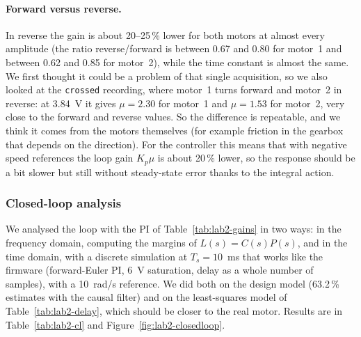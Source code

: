 \documentclass[english]{article}
\begin{document}
\paragraph{Forward versus reverse.} In reverse the gain is about 20--25\,\% lower for both motors at almost every
amplitude (the ratio reverse/forward is between 0.67 and 0.80 for motor~1 and between 0.62 and 0.85 for motor~2),
while the time constant is almost the same. We first thought it could be a problem of that single acquisition, so we
also looked at the \texttt{crossed} recording, where motor~1 turns forward and motor~2 in reverse: at 3.84~V it gives
$\mu=2.30$ for motor~1 and $\mu=1.53$ for motor~2, very close to the forward and reverse values. So the difference is
repeatable, and we think it comes from the motors themselves (for example friction in the gearbox that depends on the
direction). For the controller this means that with negative speed references the loop gain $K_p\mu$ is about
20\,\% lower, so the response should be a bit slower but still without steady-state error thanks to the integral
action.

\subsubsection{Closed-loop analysis}

We analysed the loop with the PI of Table~\ref{tab:lab2-gains} in two ways: in the frequency domain, computing the
margins of $L(s)=C(s)P(s)$, and in the time domain, with a discrete simulation at $T_s=10$~ms that works like the
firmware (forward-Euler PI, 6~V saturation, delay as a whole number of samples), with a 10~rad/s reference. We did
both on the design model (63.2\,\% estimates with the causal filter) and on the least-squares model of
Table~\ref{tab:lab2-delay}, which should be closer to the real motor. Results are in Table~\ref{tab:lab2-cl} and
Figure~\ref{fig:lab2-closedloop}.
\end{document}
